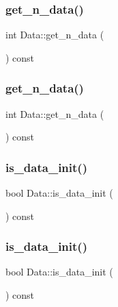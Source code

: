 \subsubsection{\texorpdfstring{get\_n\_data()}{get\_n\_data()}\hspace{0.1cm}{\footnotesize\ttfamily [1/2]}}
{\footnotesize\ttfamily int Data\+::get\+\_\+n\+\_\+data (\begin{DoxyParamCaption}{ }\end{DoxyParamCaption}) const\hspace{0.3cm}{\ttfamily [inline]}}

\mbox{\label{classData_a1ec16adf40ee062d8d75b33acfe156d5}} 
\subsubsection{\texorpdfstring{get\_n\_data()}{get\_n\_data()}\hspace{0.1cm}{\footnotesize\ttfamily [2/2]}}
{\footnotesize\ttfamily int Data\+::get\+\_\+n\+\_\+data (\begin{DoxyParamCaption}{ }\end{DoxyParamCaption}) const\hspace{0.3cm}{\ttfamily [inline]}}

\mbox{\label{classData_a804a4d59e6211aa54a629b31ad66cbd4}} 
\subsubsection{\texorpdfstring{is\_data\_init()}{is\_data\_init()}\hspace{0.1cm}{\footnotesize\ttfamily [1/2]}}
{\footnotesize\ttfamily bool Data\+::is\+\_\+data\+\_\+init (\begin{DoxyParamCaption}{ }\end{DoxyParamCaption}) const\hspace{0.3cm}{\ttfamily [inline]}}

\mbox{\label{classData_a804a4d59e6211aa54a629b31ad66cbd4}} 
\subsubsection{\texorpdfstring{is\_data\_init()}{is\_data\_init()}\hspace{0.1cm}{\footnotesize\ttfamily [2/2]}}
{\footnotesize\ttfamily bool Data\+::is\+\_\+data\+\_\+init (\begin{DoxyParamCaption}{ }\end{DoxyParamCaption}) const\hspace{0.3cm}{\ttfamily [inline]}}

